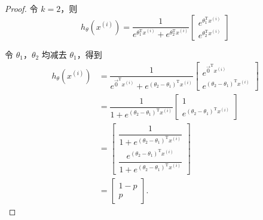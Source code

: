 \begin{proof}
    令 $k = 2$，则
    \begin{equation}
        h_\theta\left(x^{(i)}\right) = 
        \dfrac{1}{e^{\theta_1^\mathrm Tx^{(i)}} + e^{\theta_2^\mathrm Tx^{(i)}}}
        \begin{bmatrix}
        e^{\theta_1^\mathrm Tx^{(i)}} \\
        e^{\theta_2^\mathrm Tx^{(i)}}
        \end{bmatrix}
    \end{equation}

    令 $\theta_1$，$\theta_2$ 均减去 $\theta_1$，得到
    \begin{equation}
        \begin{aligned}
            h_\theta\left(x^{(i)}\right) &= 
        \dfrac{1}{e^{\vec 0^\mathrm Tx^{(i)}} + e^{(\theta_2-\theta_1)^\mathrm Tx^{(i)}}}
        \begin{bmatrix}
        e^{\vec 0^\mathrm Tx^{(i)}} \\
        e^{(\theta_2 - \theta_1)^\mathrm Tx^{(i)}}
        \end{bmatrix} \\
        &= \dfrac{1}{1 + e^{(\theta_2 - \theta_1)^\mathrm Tx^{(i)}}}
        \begin{bmatrix}
        1 \\
        e^{(\theta_2 - \theta_1)^\mathrm Tx^{(i)}}
        \end{bmatrix} \\
        &= \begin{bmatrix}
            \dfrac 1{1 + e^{(\theta_2 - \theta_1)^\mathrm Tx^{(i)}}} \\
            \dfrac{e^{(\theta_2 - \theta_1)^\mathrm Tx^{(i)}}}{1 + e^{(\theta_2 - \theta_1)^\mathrm Tx^{(i)}}}
        \end{bmatrix} \\
        &= \begin{bmatrix}
            1 - p \\
            p
        \end{bmatrix}.
        \end{aligned}
    \end{equation}
\end{proof}